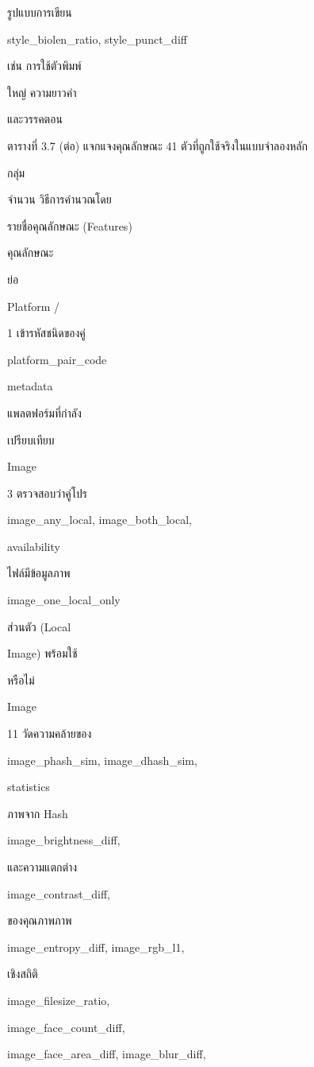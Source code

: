 \documentclass[12pt,a4paper]{report}
\begin{document}
รูปแบบการเขียน\par
style\_biolen\_ratio, style\_punct\_diff\par
เช่น การใช้ตัวพิมพ์\par
ใหญ่ ความยาวคำ\par
และวรรคตอน\par
\clearpage
\begin{center}\small ตารางที่ 3.7 (ต่อ) แจกแจงคุณลักษณะ 41 ตัวที่ถูกใช้จริงในแบบจำลองหลัก\end{center}
กลุ่ม\par
จำนวน วิธีการคำนวณโดย\par
รายชื่อคุณลักษณะ (Features)\par
คุณลักษณะ\par
ย่อ\par
Platform /\par
1 เข้ารหัสชนิดของคู่\par
platform\_pair\_code\par
metadata\par
แพลตฟอร์มที่กำลัง\par
เปรียบเทียบ\par
Image\par
3 ตรวจสอบว่าคู่โปร\par
image\_any\_local, image\_both\_local,\par
availability\par
ไฟล์มีข้อมูลภาพ\par
image\_one\_local\_only\par
ส่วนตัว (Local\par
Image) พร้อมใช้\par
หรือไม่\par
Image\par
11 วัดความคล้ายของ\par
image\_phash\_sim, image\_dhash\_sim,\par
statistics\par
ภาพจาก Hash\par
image\_brightness\_diff,\par
และความแตกต่าง\par
image\_contrast\_diff,\par
ของคุณภาพภาพ\par
image\_entropy\_diff, image\_rgb\_l1,\par
เชิงสถิติ\par
image\_filesize\_ratio,\par
image\_face\_count\_diff,\par
image\_face\_area\_diff, image\_blur\_diff,\par
\end{document}
